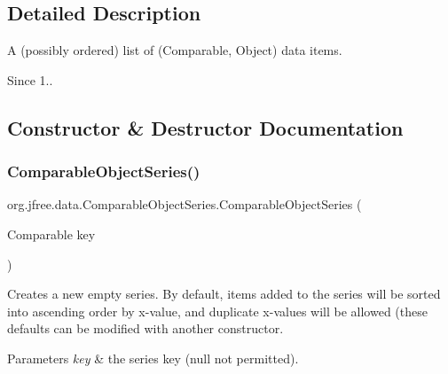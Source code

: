 \subsection{Detailed Description}
A (possibly ordered) list of (Comparable, Object) data items.

\begin{DoxySince}{Since}
1.. 
\end{DoxySince}


\subsection{Constructor \& Destructor Documentation}
\mbox{\label{classorg_1_1jfree_1_1data_1_1_comparable_object_series_a290245fbc54c2ed7b2429b58464fd0cc}} 
\subsubsection{\texorpdfstring{Comparable\+Object\+Series()}{ComparableObjectSeries()}\hspace{0.1cm}{\footnotesize\ttfamily [1/2]}}
{\footnotesize\ttfamily org.\+jfree.\+data.\+Comparable\+Object\+Series.\+Comparable\+Object\+Series (\begin{DoxyParamCaption}\item[{Comparable}]{key }\end{DoxyParamCaption})}

Creates a new empty series. By default, items added to the series will be sorted into ascending order by x-\/value, and duplicate x-\/values will be allowed (these defaults can be modified with another constructor.


\begin{DoxyParams}{Parameters}
{\em key} & the series key ({\ttfamily null} not permitted). \\
\hline
\end{DoxyParams}
\mbox{\label{classorg_1_1jfree_1_1data_1_1_comparable_object_series_ab17013f6a3052e15009de0f140be7830}} 
